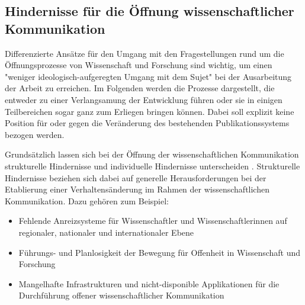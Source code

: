 \subsection{Hindernisse für die Öffnung wissenschaftlicher Kommunikation}

Differenzierte Ansätze für den Umgang mit den Fragestellungen rund um die Öffnungsprozesse von Wissenschaft und Forschung sind wichtig, um einen "weniger ideologisch-aufgeregten Umgang mit dem Sujet" \cite[:13]{Naeder_2010} bei der Ausarbeitung der Arbeit zu erreichen. Im Folgenden werden die Prozesse dargestellt, die entweder zu einer Verlangsamung der Entwicklung führen oder sie in einigen Teilbereichen sogar ganz zum Erliegen bringen können. Dabei soll explizit keine Position für oder gegen die Veränderung des bestehenden Publikationssystems bezogen werden.

Grundsätzlich lassen sich bei der Öffnung der wissenschaftlichen Kommunikation strukturelle Hindernisse und individuelle Hindernisse unterscheiden \cite{Scheliga_2014}. Strukturelle Hindernisse beziehen sich dabei auf generelle Herausforderungen bei der Etablierung einer Verhaltensänderung im Rahmen der wissenschaftlichen Kommunikation. Dazu gehören zum Beispiel:
\begin{itemize}
\item Fehlende Anreizsysteme für Wissenschaftler und Wissenschaftlerinnen auf regionaler, nationaler und internationaler Ebene
\item Führungs- und Planlosigkeit der Bewegung für Offenheit in Wissenschaft und Forschung
\item Mangelhafte Infrastrukturen und nicht-disponible Applikationen für die Durchführung offener wissenschaftlicher Kommunikation
\end{itemize}


